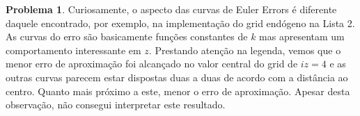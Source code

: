 \documentclass[11pt]{article}
\theoremstyle{definition}
\newtheorem{prob}{Problema}
\theoremstyle{solution}
\begin{document}
\begin{prob}
	Curiosamente, o aspecto das curvas de Euler Errors é diferente daquele encontrado, por exemplo, na implementação do grid endógeno na Lista 2. As curvas do erro são basicamente funções constantes de $k$ mas apresentam um comportamento interessante em $z$. Prestando atenção na legenda, vemos que o menor erro de aproximação foi alcançado no valor central do grid de $iz = 4$ e as outras curvas parecem estar dispostas duas a duas de acordo com a distância ao centro. Quanto mais próximo a este, menor o erro de aproximação. Apesar desta observação, não consegui interpretar este resultado.
\end{prob}
\end{document}
